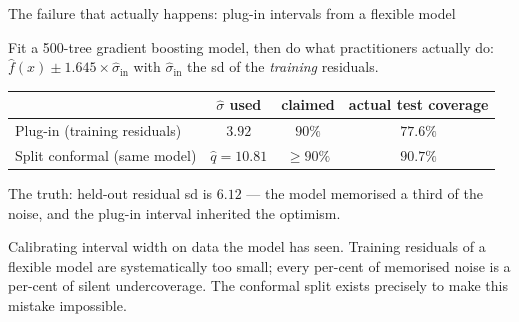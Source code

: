 \documentclass[aspectratio=169,11pt]{beamer}
\begin{document}
\begin{frame}{The failure that actually happens: plug-in intervals from a flexible model}
  \begin{numexample}
    Fit a 500-tree gradient boosting model, then do what practitioners actually do:
    $\hat f(x) \pm 1.645 \times \hat\sigma_{\text{in}}$ with $\hat\sigma_{\text{in}}$
    the sd of the \emph{training} residuals.
    \begin{center}
    \footnotesize
    \begin{tabular}{@{}lccc@{}}
      \toprule
      & $\hat\sigma$ used & claimed & actual test coverage \\
      \midrule
      Plug-in (training residuals) & $3.92$ & $90\%$ & $\mathbf{77.6\%}$ \\
      Split conformal (same model) & $\hat q = 10.81$ & $\ge 90\%$ & $90.7\%$ \\
      \bottomrule
    \end{tabular}
    \end{center}
    The truth: held-out residual sd is $6.12$ --- the model memorised a third of the
    noise, and the plug-in interval inherited the optimism.
  \end{numexample}
  \begin{mistake}
    Calibrating interval width on data the model has seen. Training residuals of a
    flexible model are systematically too small; every per-cent of memorised noise is
    a per-cent of silent undercoverage. The conformal split exists precisely to make
    this mistake impossible.
  \end{mistake}
\end{frame}
\end{document}
